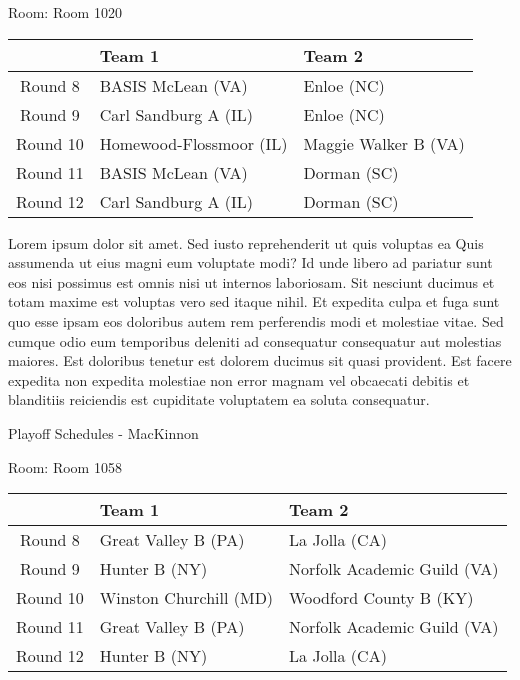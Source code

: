\documentclass{article}%
\begin{document}
\linebreak%
\begin{flushleft}%
\begin{Large}%
Room: Room 1020%
\end{Large}%
\end{flushleft}%
\begin{tabularx}{\textwidth}{|c|Y|Y|}%
\hline%
&Team 1&Team 2\\%
\hline%
Round 8&BASIS McLean (VA)&Enloe (NC)\\%
Round 9&Carl Sandburg A (IL)&Enloe (NC)\\%
Round 10&Homewood{-}Flossmoor (IL)&Maggie Walker B (VA)\\%
Round 11&BASIS McLean (VA)&Dorman (SC)\\%
Round 12&Carl Sandburg A (IL)&Dorman (SC)\\%
\hline%
\end{tabularx}%
\vspace*{8pt}%
\linebreak%
\newline%
Lorem ipsum dolor sit amet. Sed iusto reprehenderit ut quis voluptas ea Quis assumenda ut eius magni eum voluptate modi? Id unde libero ad pariatur sunt eos nisi possimus est omnis nisi ut internos laboriosam. Sit nesciunt ducimus et totam maxime est voluptas vero sed itaque nihil. Et expedita culpa et fuga sunt quo esse ipsam eos doloribus autem rem perferendis modi et molestiae vitae.\newline%
\newline%
Sed cumque odio eum temporibus deleniti ad consequatur consequatur aut molestias maiores. Est doloribus tenetur est dolorem ducimus sit quasi provident. Est facere expedita non expedita molestiae non error magnam vel obcaecati debitis et blanditiis reiciendis est cupiditate voluptatem ea soluta consequatur.%
\newpage%
\begin{center}%
\begin{Huge}%
Playoff Schedules {-} MacKinnon%
\end{Huge}%
\end{center}%
\begin{flushleft}%
\begin{Large}%
Room: Room 1058%
\end{Large}%
\end{flushleft}%
\begin{tabularx}{\textwidth}{|c|Y|Y|}%
\hline%
&Team 1&Team 2\\%
\hline%
Round 8&Great Valley B (PA)&La Jolla (CA)\\%
Round 9&Hunter B (NY)&Norfolk Academic Guild (VA)\\%
Round 10&Winston Churchill (MD)&Woodford County B (KY)\\%
Round 11&Great Valley B (PA)&Norfolk Academic Guild (VA)\\%
Round 12&Hunter B (NY)&La Jolla (CA)\\%
\hline%
\end{tabularx}%
\end{document}
